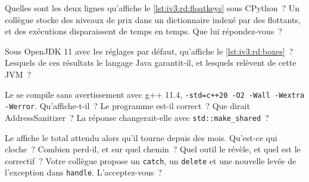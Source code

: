\begin{question}\label{iq:iv3:reading-debugging-and-software-design:8}
Quelles sont les deux lignes qu'affiche le \cref{lst:iv3:rd:floatkeys} sous CPython~? Un collègue stocke des niveaux de prix dans un dictionnaire indexé par des flottants, et des exécutions disparaissent de temps en temps. Que lui répondez-vous~?
\label{lst:iv3:rd:floatkeys}
\end{question}

\begin{question}\label{iq:iv3:reading-debugging-and-software-design:9}
Sous OpenJDK 11 avec les réglages par défaut, qu'affiche le \cref{lst:iv3:rd:boxes}~? Lesquels de ces résultats le langage Java garantit-il, et lesquels relèvent de cette JVM~?
\label{lst:iv3:rd:boxes}
\end{question}

\begin{question}\label{iq:iv3:reading-debugging-and-software-design:10}
Le  se compile sans avertissement avec g++ 11.4, \texttt{-std=c++20 -O2 -Wall -Wextra -Werror}. Qu'affiche-t-il~? Le programme est-il correct~? Que dirait AddressSanitizer~? La réponse changerait-elle avec \texttt{std::make\_shared}~?
\label{lst:iv3:rd:dtor}
\end{question}

\begin{question}\label{iq:iv3:reading-debugging-and-software-design:11}
Le  affiche le total attendu alors qu'il tourne depuis des mois. Qu'est-ce qui cloche~? Combien perd-il, et sur quel chemin~? Quel outil le révèle, et quel est le correctif~? Votre collègue propose un \texttt{catch}, un \texttt{delete} et une nouvelle levée de l'exception dans \texttt{handle}. L'acceptez-vous~?
\label{lst:iv3:rd:exleak}
\end{question}

